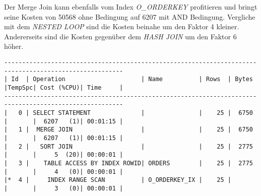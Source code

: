 \documentclass[11pt,a4paper,parskip=half]{scrartcl}
\begin{document}
Der Merge Join kann ebenfalls vom Index \emph{O\_ORDERKEY} profitieren und bringt seine Kosten von 50568 ohne Bedingung auf 6207 mit AND Bedingung. Vergliche mit dem \emph{NESTED LOOP} sind die Kosten beinahe um den Faktor 4 kleiner. Andererseits sind die Kosten gegenüber dem \emph{HASH JOIN} um den Faktor 6 höher.
\begin{lstlisting}
-------------------------------------------------------------------------------------------------------                                                                                                                                                                                                      
| Id  | Operation                     | Name          | Rows  | Bytes |TempSpc| Cost (%CPU)| Time     |                                                                                                                                                                                                      
-------------------------------------------------------------------------------------------------------                                                                                                                                                                                                      
|   0 | SELECT STATEMENT              |               |    25 |  6750 |       |  6207   (1)| 00:01:15 |                                                                                                                                                                                                      
|   1 |  MERGE JOIN                   |               |    25 |  6750 |       |  6207   (1)| 00:01:15 |                                                                                                                                                                                                      
|   2 |   SORT JOIN                   |               |    25 |  2775 |       |     5  (20)| 00:00:01 |                                                                                                                                                                                                      
|   3 |    TABLE ACCESS BY INDEX ROWID| ORDERS        |    25 |  2775 |       |     4   (0)| 00:00:01 |                                                                                                                                                                                                      
|*  4 |     INDEX RANGE SCAN          | O_ORDERKEY_IX |    25 |       |       |     3   (0)| 00:00:01 |                                                                                                                                                                                                      

\end{lstlisting}
\end{document}
